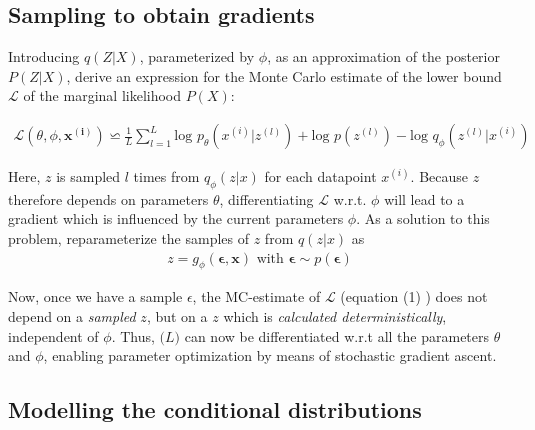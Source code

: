 \documentclass{article}
\begin{document}

\subsection{Sampling to obtain gradients}

Introducing $q(Z|X)$, parameterized by $\phi$, as an approximation of the posterior $P(Z|X)$, \cite{kingma2013auto} derive an expression for the Monte Carlo estimate of the lower bound $\mathcal{L}$ of the marginal likelihood $P(X)$:

\begin{align}
\mathcal{L}(\theta ,\phi ,  \mathbf{x^{(i)}}) \backsimeq \frac{1}{L} \sum_{l=1}^{L} \text{log } p_{\theta} (x^{(i)}|z^{(l)})+ \text{log }p(z^{(l)}	)-\text{log }q_{\phi}(z^{(l)}|x^{(i)})
\end{align}

Here, $z$ is sampled $l$ times from $q_{\phi}(z|x)$ for each datapoint $x^{(i)}$. Because $z$ therefore depends on parameters $\theta$, differentiating $\mathcal{L}$ w.r.t. $\phi$ will lead to a gradient which is influenced by the current parameters $\phi$. 
As a solution to this problem, \cite{kingma2013auto} reparameterize the samples of $z$ from $q(z|x)$ as
\begin{align}
z = g_\phi(\mathbf{\epsilon},\mathbf{x}) \text{  with  } \mathbf{\epsilon} \sim p(\mathbf{\epsilon}) 
\end{align} 

Now, once we have a sample $\epsilon$, the MC-estimate of $\mathcal{L}$ (equation (1) ) does not depend on a \textit{sampled} $z$, but on a  $z$ which is \textit{calculated deterministically}, independent of $\phi$. Thus, $\mathcal(L)$ can now be differentiated w.r.t all the parameters $\theta$ and $\phi$, enabling parameter optimization by means of stochastic gradient ascent.

\subsection{Modelling the conditional distributions}
\end{document}
